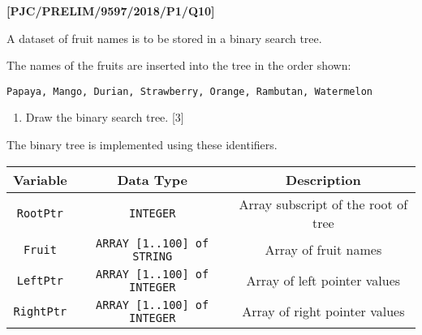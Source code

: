 \item \textbf{{[}PJC/PRELIM/9597/2018/P1/Q10{]} }

A dataset of fruit names is to be stored in a binary search tree. 

The names of the fruits are inserted into the tree in the order shown: 
\noindent \begin{center}
\texttt{Papaya, Mango, Durian, Strawberry, Orange, Rambutan, Watermelon}
\par\end{center}
\begin{enumerate}
\item Draw the binary search tree. \hfill{} {[}3{]}
\end{enumerate}
The binary tree is implemented using these identifiers. 
\noindent \begin{center}
\begin{tabular}{|c|c|c|}
\hline 
\textbf{Variable} & \textbf{Data Type} & \textbf{Description}\tabularnewline
\hline 
\texttt{RootPtr} & \texttt{INTEGER} & Array subscript of the root of tree\tabularnewline
\hline 
\texttt{Fruit} & \texttt{ARRAY {[}1..100{]} of STRING} & Array of fruit names\tabularnewline
\hline 
\texttt{LeftPtr} & \texttt{ARRAY {[}1..100{]} of INTEGER} & Array of left pointer values\tabularnewline
\hline 
\texttt{RightPtr} & \texttt{ARRAY {[}1..100{]} of INTEGER} & Array of right pointer values \tabularnewline
\hline 
\end{tabular}
\par\end{center}
